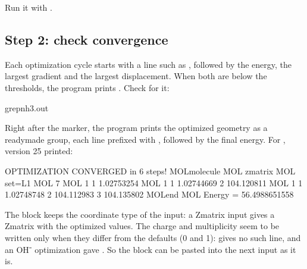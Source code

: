 \documentclass[letterpaper,10pt,english,openany,oneside]{sphinxmanual}
\begin{document}
\sphinxAtStartPar
Run it with .


\subsection{Step 2: check convergence}
\label{\detokenize{start/getting-started:step-2-check-convergence}}
\sphinxAtStartPar
Each optimization cycle starts with a line such as , followed by the energy, the
largest gradient and the largest displacement. When both are below the thresholds, the program prints
. Check for it:



\begin{sphinxVerbatim}[commandchars=\\\{\}]
grepnh3.out
\end{sphinxVerbatim}

\sphinxAtStartPar
Right after the marker, the program prints the optimized geometry as a ready\sphinxhyphen{}made  group, each line
prefixed with , followed by the final energy. For , version 25 printed:

\begin{sphinxVerbatim}[commandchars=\\\{\}]
 OPTIMIZATION CONVERGED in 6 steps!
MOL\PYGZgt{}\PYGZdl{}molecule
MOL\PYGZgt{} z\PYGZhy{}matrix
MOL\PYGZgt{} set=L1
MOL\PYGZgt{}   7
MOL\PYGZgt{}   1    1    1.02753254
MOL\PYGZgt{}   1    1    1.02744669    2    104.120811
MOL\PYGZgt{}   1    1    1.02748748    2    104.112983   \PYGZhy{}3    104.135802
MOL\PYGZgt{}\PYGZdl{}end
MOL\PYGZgt{} Energy =    \PYGZhy{}56.4988651558
\end{sphinxVerbatim}



\sphinxAtStartPar
The block keeps the coordinate type of the input: a Z\sphinxhyphen{}matrix input gives a Z\sphinxhyphen{}matrix with the optimized values. The
charge and multiplicity seem to be written only when they differ from the defaults (0 and 1):  gives no such
line, and an OH⁻ optimization gave . So the block can be pasted into the next input as it is.
\end{document}

